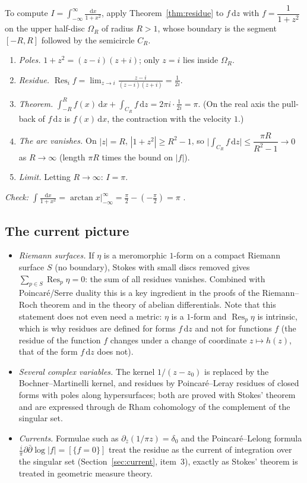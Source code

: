 \documentclass[11pt,a4paper]{article}
\newcounter{thm}[section]
\numberwithin{equation}{section}
\theoremstyle{definition}
\theoremstyle{plain}
\newcommand{\dd}{\mathrm{d}}
\newcommand{\Res}{\operatorname{Res}}
\begin{document}
\begin{example}\label{ex:realint}
To compute $I=\displaystyle\int_{-\infty}^\infty\frac{\dd x}{1+x^2}$, apply Theorem~\ref{thm:residue} to $f\,\dd z$ with $f=\dfrac1{1+z^2}$ on the upper half-disc $\Omega_R$ of radius $R>1$, whose boundary is the segment $[-R,R]$ followed by the semicircle $C_R$.
\begin{enumerate}
\item \emph{Poles.} $1+z^2=(z-i)(z+i)$; only $z=i$ lies inside $\Omega_R$.
\item \emph{Residue.} $\Res_if=\lim_{z\to i}\frac{z-i}{(z-i)(z+i)}=\frac1{2i}$.
\item \emph{Theorem.} $\int_{-R}^Rf(x)\,\dd x+\int_{C_R}f\,\dd z=2\pi i\cdot\frac1{2i}=\pi$. (On the real axis the pull-back of $f\,\dd z$ is $f(x)\,\dd x$, the contraction with the velocity $1$.)
\item \emph{The arc vanishes.} On $|z|=R$, $|1+z^2|\ge R^2-1$, so $\bigl|\int_{C_R}f\,\dd z\bigr|\le\dfrac{\pi R}{R^2-1}\to0$ as $R\to\infty$ (length $\pi R$ times the bound on $|f|$).
\item \emph{Limit.} Letting $R\to\infty$: $I=\pi$.
\end{enumerate}
\emph{Check:} $\int\frac{\dd x}{1+x^2}=\arctan x\big|_{-\infty}^\infty=\frac\pi2-(-\frac\pi2)=\pi$ \checkmark.
\end{example}

\subsection{The current picture}\label{sec:rescurrent}

\begin{itemize}
\item \emph{Riemann surfaces.} If $\eta$ is a meromorphic $1$-form on a compact Riemann surface $S$ (no boundary), Stokes with small discs removed gives $\sum_{p\in S}\Res_p\eta=0$: the sum of all residues vanishes. Combined with Poincar\'e/Serre duality this is a key ingredient in the proofs of the Riemann--Roch theorem and in the theory of abelian differentials. Note that this statement does not even need a metric: $\eta$ is a $1$-form and $\Res_p\eta$ is intrinsic, which is why residues are defined for forms $f\,\dd z$ and not for functions $f$ (the residue of the function $f$ changes under a change of coordinate $z\mapsto h(z)$, that of the form $f\,\dd z$ does not).
\item \emph{Several complex variables.} The kernel $1/(z-z_0)$ is replaced by the Bochner--Martinelli kernel, and residues by Poincar\'e--Leray residues of closed forms with poles along hypersurfaces; both are proved with Stokes' theorem and are expressed through de Rham cohomology of the complement of the singular set.
\item \emph{Currents.} Formulae such as $\partial_{\bar z}(1/\pi z)=\delta_0$ and the Poincar\'e--Lelong formula $\frac i\pi\partial\bar\partial\log|f|=[\{f=0\}]$ treat the residue as the current of integration over the singular set (Section~\ref{sec:current}, item~3), exactly as Stokes' theorem is treated in geometric measure theory.
\end{itemize}
\end{document}
